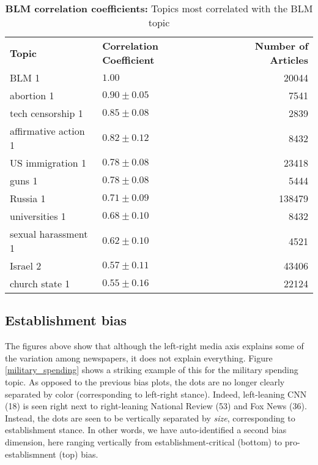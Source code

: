 \documentclass[10pt,letterpaper]{article}
\newlength\savedwidth
\newcommand\thickhline{\noalign{\global\savedwidth\arrayrulewidth\global\arrayrulewidth 2pt}%
\hline
\noalign{\global\arrayrulewidth\savedwidth}}
\begin{document}
\begin{table}[tb]
\begin{adjustwidth}{-2.25in}{0in} %
\centering
\caption{
{\bf BLM correlation coefficients:}
Topics most correlated with the BLM topic}
\begin{tabular}{|l|l|r|} \hline
\textbf{Topic} & \textbf{Correlation Coefficient} & \textbf{Number of Articles}\\ 
 \thickhline
BLM 1 & $1.00$ & 20044 \\ \hline
abortion 1 & $0.90 \pm 0.05$ & 7541 \\ \hline
tech censorship 1 & $0.85 \pm 0.08$ & 2839 \\ \hline
affirmative action 1 & $0.82 \pm 0.12$ & 8432\\ \hline
US immigration 1 & $0.78 \pm 0.08$ & 23418 \\ \hline
guns 1 & $0.78 \pm  0.08$ & 5444 \\\hline
Russia 1 & $0.71 \pm 0.09$ & 138479 \\ \hline
universities 1 & $0.68 \pm 0.10$ & 8432 \\ \hline
sexual harassment 1 & $0.62\pm 0.10$ & 4521 \\ \hline
Israel 2 & $0.57 \pm 0.11$ & 43406 \\ \hline
church state 1 & $0.55 \pm 0.16$ & 22124 \\ \hline
\end{tabular}
\begin{flushleft}
\end{flushleft}
\label{blm_corr}
\end{adjustwidth}
\end{table}




\subsection*{Establishment bias}
The figures above show that although the left-right media axis explains some of the variation among newspapers, it does not explain everything. 
Figure \ref{military_spending} shows a striking example of this for the military spending topic.
As opposed to the previous bias plots, the dots are no longer clearly separated by color (corresponding to left-right stance). 
Indeed, left-leaning CNN (18) is seen right next to right-leaning National Review (53) and Fox News (36).
Instead, the dots are seen to be vertically separated by {\it size}, corresponding to establishment stance. 
In other words, we have auto-identified a second bias dimension, here ranging vertically from establishment-critical (bottom) to pro-establismnent (top) bias.
\end{document}
